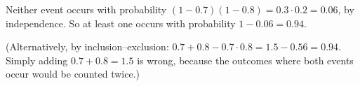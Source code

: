 Neither event occurs with probability $(1-0.7)(1-0.8)=0.3\cdot0.2=0.06$, by independence. So at least one occurs with probability $1-0.06=\boxed{0.94}$.

(Alternatively, by inclusion--exclusion: $0.7+0.8-0.7\cdot0.8=1.5-0.56=0.94$. Simply adding $0.7+0.8=1.5$ is wrong, because the outcomes where both events occur would be counted twice.)
